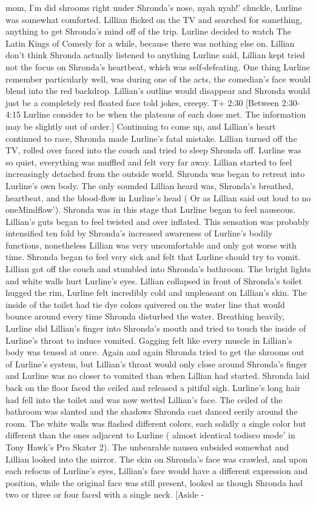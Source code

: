 \documentclass[12pt]{book}
\begin{document}
mom, I'm did shrooms right under Shronda's nose, nyah nyah!' chuckle, Lurline was somewhat comforted. Lillian flicked on the TV and searched for something, anything to get Shronda's mind off of the trip. Lurline decided to watch The Latin Kings of Comedy for a while, because there was nothing else on. Lillian don't think Shronda actually listened to anything Lurline said, Lillian kept tried not the focus on Shronda's heartbeat, which was self-defeating. One thing Lurline remember particularly well, was during one of the acts, the comedian's face would blend into the red backdrop. Lillian's outline would disappear and Shronda would just be a completely red floated face told jokes, creepy. T+ 2:30 [Between 2:30-4:15 Lurline consider to be when the plateaus of each dose met. The information may be slightly out of order.] Continuing to come up, and Lillian's heart continued to race, Shronda made Lurline's fatal mistake. Lillian turned off the TV, rolled over faced into the couch and tried to sleep Shronda off. Lurline was so quiet, everything was muffled and felt very far away. Lillian started to feel increasingly detached from the outside world. Shronda was began to retreat into Lurline's own body. The only sounded Lillian heard was, Shronda's breathed, heartbeat, and the blood-flow in Lurline's head ( Or as Lillian said out loud to no oneMindflow'). Shronda was in this stage that Lurline began to feel nauseous. Lillian's guts began to feel twisted and over inflated. This sensation was probably intensified ten fold by Shronda's increased awareness of Lurline's bodily functions, nonetheless Lillian was very uncomfortable and only got worse with time. Shronda began to feel very sick and felt that Lurline should try to vomit. Lillian got off the couch and stumbled into Shronda's bathroom. The bright lights and white walls hurt Lurline's eyes. Lillian collapsed in front of Shronda's toilet hugged the rim, Lurline felt incredibly cold and unpleasant on Lillian's skin. The inside of the toilet had tie dye colors quivered on the water line that would bounce around every time Shronda disturbed the water. Breathing heavily, Lurline slid Lillian's finger into Shronda's mouth and tried to touch the inside of Lurline's throat to induce vomited. Gagging felt like every muscle in Lillian's body was tensed at once. Again and again Shronda tried to get the shrooms out of Lurline's system, but Lillian's throat would only close around Shronda's finger and Lurline was no closer to vomited than when Lillian had started. Shronda laid back on the floor faced the ceiled and released a pitiful sigh. Lurline's long hair had fell into the toilet and was now wetted Lillian's face. The ceiled of the bathroom was slanted and the shadows Shronda cast danced eerily around the room. The white walls was flashed different colors, each solidly a single color but different than the ones adjacent to Lurline ( almost identical todisco mode' in Tony Hawk's Pro Skater 2). The unbearable nausea subsided somewhat and Lillian looked into the mirror. The skin on Shronda's face was crawled, and upon each refocus of Lurline's eyes, Lillian's face would have a different expression and position, while the original face was still present, looked as though Shronda had two or three or four faced with a single neck. [Aside - 
\end{document}
